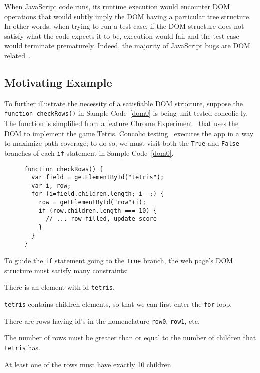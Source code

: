 When JavaScript code runs, its runtime execution would encounter DOM operations that would subtly imply the DOM having a particular tree structure. 
In other words, when trying to run a test case, if the DOM structure does not satisfy what the code expects it to be, execution would fail and the test case would terminate prematurely.
Indeed, the majority of JavaScript bugs are DOM related~\cite{frolin2013}.

\subsection{Motivating Example}
To further illustrate the necessity of a satisfiable DOM structure, suppose the {\tt function checkRows()} in Sample Code~\ref{dom0} is being unit tested concolic-ly.  
The function is simplified from a feature Chrome Experiment~\cite{domtris} that uses the DOM to implement the game Tetris.  
Concolic testing~\cite{cute} executes the app in a way to maximize path coverage; to do so, we must visit both the {\tt True} and {\tt False} branches of each {\tt if} statement in Sample Code~\ref{dom0}.
\begin{figure}
\begin{lstlisting}[caption=Example code whose tests and execution depend on the Document Object Model having a precise tree structure. {\tt getElementById()} is equivalent to {\tt document.getElementById()}.,label=dom0]
function checkRows() {
  var field = getElementById("tetris"); 
  var i, row;
  for (i=field.children.length; i--;) {
    row = getElementById("row"+i);
    if (row.children.length === 10) {
      // ... row filled, update score
    }
  }
}
\end{lstlisting}
\end{figure}

To guide the {\tt if} statement going to the {\tt True} branch, the web page's DOM structure must satisfy many constraints:
\begin {compactitem}
\item There is an element with id {\tt tetris}.
\item {\tt tetris} contains children elements, so that we can first enter the {\tt for} loop.
\item There are rows having id's in the nomenclature {\tt row0}, {\tt row1}, etc.
\item The number of rows must be greater than or equal to the number of children that {\tt tetris} has.
\item At least one of the rows must have exactly 10 children.
\end {compactitem}

